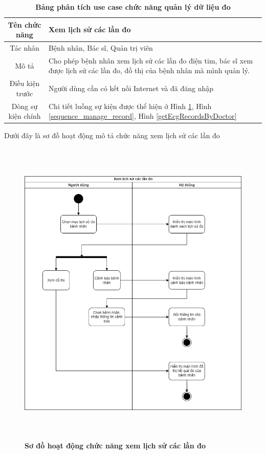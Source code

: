   \begin{table}[H]
    \caption{\bfseries \fontsize{12pt}{0pt}\selectfont Bảng phân tích use case chức năng quản lý dữ liệu đo}
    \centering
    \begin{tabularx}{0.9\textwidth}{|c|X|}
      \hline
      \textbf{Tên chức năng} & \textbf{Xem lịch sử các lần đo} \\
      \hline
      Tác nhân & Bệnh nhân, Bác sĩ, Quản trị viên \\
      \hline
      Mô tả & Cho phép bệnh nhân xem lịch sử các lần đo điện tim, bác sĩ xem được lịch sử các lần đo, đồ thị của bệnh nhân
      mà mình quản lý.\\
      \hline
      Điều kiện trước & Người dùng cần có kết nối Internet và đã đăng nhập \\
      \hline
      Dòng sự kiện chính & 
        Chi tiết luồng sự kiện được thể hiện ở Hình \ref{activity_record_history}, Hình \ref{sequence_manage_record}, Hình \ref{getEcgRecordsByDoctor} 
        \\
      \hline
    \end{tabularx}
  \end{table}
  Dưới đây là sơ đồ hoạt động mô tả chức năng xem lịch sử các lần đo
  \begin{figure}[H]
    \centering
    \includegraphics[width=13.5cm,height=15cm]{Images/acitivity/activity_record_history.png}
    \caption[Sơ đồ hoạt động chức năng xem lịch sử các lần đo]{\bfseries \fontsize{12pt}{0pt}
    \selectfont Sơ đồ hoạt động chức năng xem lịch sử các lần đo}
    \label{activity_record_history} %
  \end{figure}


